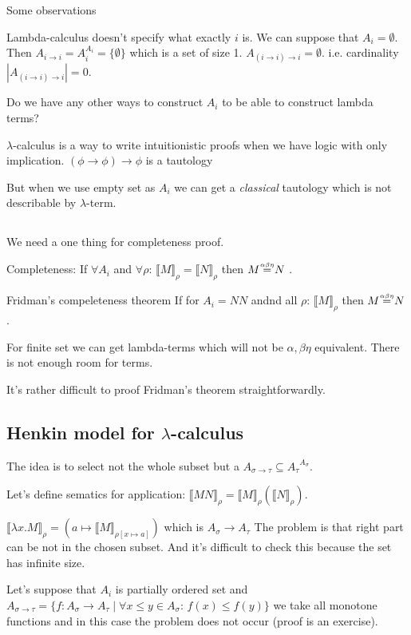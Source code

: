\documentclass[a4paper,10pt]{book}
\newcommand{\sem}[2]{ \llbracket#1\rrbracket_{#2} }
\newcommand\abceq{\mathrel{\overset{\makebox[0pt]{\mbox{\normalfont\tiny\sffamily $\alpha\beta\eta$}}}{=}}}
\begin{document}
Some observations

Lambda-calculus doesn't specify what exactly $i$ is. We can suppose that $A_i=\emptyset$. Then
$A_{i\rightarrow i} = A_i^{A_i} = \{ \emptyset \}$ which is a set of size 1. $A_{(i\rightarrow i)\rightarrow i} = { \emptyset }$. i.e. cardinality $|A_{(i\rightarrow i)\rightarrow i} | = 0 $.

Do we have any other ways to construct $A_i$ to be able to construct lambda terms?

$\lambda$-calculus is a way to write intuitionistic proofs when we have logic with only implication. 
 $(\phi \rightarrow \phi)\rightarrow \phi$ is a tautology

But when we use empty set as $A_i$ we can get a \textit{classical} tautology which is not describable by $\lambda$-term.

\subsection{}
We need a one thing for completeness proof.

Completeness: If $\forall A_i$ and $\forall \rho$: $\sem{M}{\rho} = \sem{N}{\rho}$ then $M\abceq N$ .

Fridman's compeleteness theorem
If for $A_i=NN$ andnd all $\rho$: $\sem{M}{\rho}$ then $M\abceq N$.

For finite set we can get lambda-terms which will not be $\alpha,\beta\eta$ equivalent. There is not enough room for terms.

It's rather difficult to proof Fridman's theorem straightforwardly.

\subsection{Henkin model for $\lambda$-calculus}
The idea is to select not the whole subset but a $A_{\sigma \rightarrow \tau} \subseteq {A_\tau}^{A_\sigma}$.

Let's define sematics for application:
$\sem{MN}{\rho} = \sem{M}{\rho}(\sem{N}{\rho})$.

$\sem{\lambda x . M}{\rho} = (a \mapsto \sem{M}{\rho[x \mapsto a]})$ which is $A_\sigma \rightarrow A_\tau$
The problem is that right part can be not in the chosen subset. And it's difficult to check this because the 
set has infinite size.

Let's suppose that $A_i$ is partially ordered set and
$A_{\sigma \rightarrow \tau} = \{ f: A_\sigma \rightarrow A_\tau \mid 
\forall x \leq y \in A_\sigma$: $f(x) \leq f(y)\}$
we take all monotone functions and in this case the problem does not occur (proof is an exercise).
\end{document}

